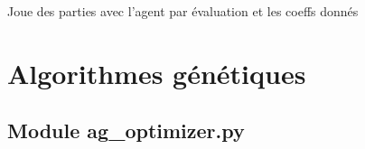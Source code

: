 \documentclass[letterpaper,10pt,french]{sphinxmanual}
\begin{document}

\begin{fulllineitems}
\label{\detokenize{index:agent_evaluation.getrandbits}}
\end{fulllineitems}


\begin{fulllineitems}
\label{\detokenize{index:agent_evaluation.playGameWithAgentEvaluation}}
Joue des parties avec l’agent par évaluation et les coeffs donnés

\end{fulllineitems}


\begin{fulllineitems}
\label{\detokenize{index:agent_evaluation.random}}\pysiglinewithargsret{\sphinxcode{agent\_evaluation.}\sphinxbfcode{random}}{}{{ $\rightarrow$ x in the interval {[}0, 1).}}
\end{fulllineitems}



\chapter{Algorithmes génétiques}
\label{\detokenize{index:algorithmes-genetiques}}

\section{Module ag\_optimizer.py}
\label{\detokenize{index:module-ag_optimizer}}\label{\detokenize{index:module-ag-optimizer-py}}
\end{document}
